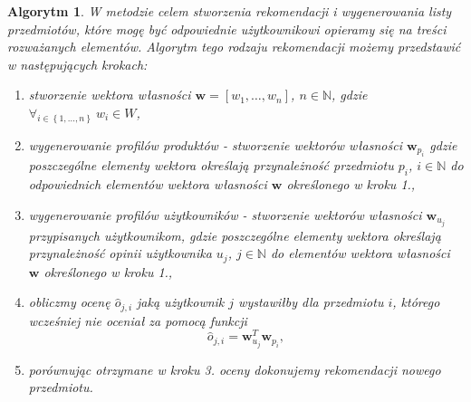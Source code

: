 \documentclass[12pt,a4paper]{report}
\newtheorem{algorytm}[df]{Algorytm}
\newcommand{\set}[1]{\left\lbrace {#1} \right\rbrace}
\newcommand{\setN}{\mathbb{N}}
\newcommand{\setWlasnosci}{\mathit{W}}
\begin{document}
\begin{algorytm}
W metodzie celem stworzenia rekomendacji i wygenerowania listy przedmiotów, które mogę być odpowiednie użytkownikowi opieramy się na treści rozważanych elementów. Algorytm tego rodzaju rekomendacji możemy przedstawić w następujących krokach:
\begin{enumerate}
\item stworzenie wektora własności $\mathbf{w} = [w_1, \ldots, w_n]$, $n \in \setN$, gdzie $\forall_{i \in \set{1, \ldots, n}} \: w_i \in \setWlasnosci$,

\item wygenerowanie profilów produktów - stworzenie wektorów własności $\mathbf{w}_{p_i}$ gdzie poszczególne elementy wektora określają przynależność przedmiotu $p_i$, $i \in \setN$ do odpowiednich elementów wektora własności $\mathbf{w}$ określonego w kroku 1.,

\item wygenerowanie profilów użytkowników - stworzenie wektorów własności $\mathbf{w}_{u_j}$ przypisanych użytkownikom, gdzie poszczególne elementy wektora określają przynależność opinii użytkownika $u_j$, $j \in \setN$ do elementów wektora własności $\mathbf{w}$ określonego w kroku 1.,

\item obliczmy ocenę $\widehat{o}_{j,i}$ jaką użytkownik $j$ wystawiłby dla przedmiotu $i$, którego wcześniej nie oceniał za pomocą funkcji
$$
\widehat{o}_{j,i} = \mathbf{w}_{u_j}^T \mathbf{w}_{p_i},
$$

\item porównując otrzymane w kroku 3. oceny dokonujemy rekomendacji nowego przedmiotu.
\end{enumerate}
\end{algorytm}
\end{document}
